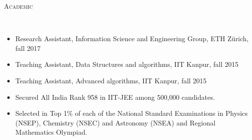 \documentclass[9pt]{article}
\newenvironment{changemargin}[2]{%
  \begin{list}{}{%
      \setlength{\topsep}{0pt}%
    \setlength{\leftmargin}{#1}%
    \setlength{\rightmargin}{#2}%
    \setlength{\listparindent}{\parindent}%
  \setlength{\itemindent}{\parindent}%
    \setlength{\parsep}{\parskip}%
    }%
  \item[]}{\end{list}
    }
\newcommand{\lineover}{
  \begin{changemargin}{-0.05in}{-0.10in}
    \vspace*{-9pt}
    \hrulefill \\
    \vspace*{-2pt}
  \end{changemargin}
}
\newcommand{\header}[1]{
  \begin{changemargin}{-0.5in}{-0.5in}
    \scshape{#1}\\
        \lineover
  \end{changemargin}
}
\newenvironment{body} {
  \vspace*{-16pt}
        \begin{changemargin}{-0.6in}{-0.65in}
        }	
        {\end{changemargin}
}
\begin{document}
\begin{body}

  \end{body}

\vspace{2 mm}
\header{Academic}
\begin{body}
  \vspace{14pt}
        \begin{changemargin}{0.15in}{0.15in}
          \begin{itemize}
            \item Research Assistant, Information Science and Engineering Group, ETH Z{\"u}rich, fall 2017
            \item Teaching Assistant, Data Structures and algorithms, IIT Kanpur, fall 2015
            \item Teaching Assistant, Advanced algorithms, IIT Kanpur, fall 2015
            \item Secured All India Rank 958 in IIT-JEE among 500,000 candidates.
            \item Selected in Top 1\% of each of the National Standard Examinations 
              in Physics (NSEP), Chemistry (NSEC) and Astronomy (NSEA) and Regional
              Mathematics Olympiad.
          \end{itemize}
        \end{changemargin}
\end{body}
\end{document}
